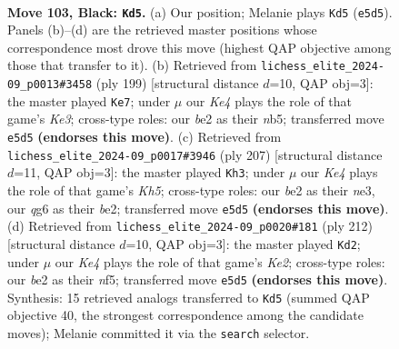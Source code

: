 \documentclass[11pt]{article}
\begin{document}
\clearpage

\begin{figure}[p]\centering
\begin{subfigure}{0.46\textwidth}\centering
\resizebox{\linewidth}{!}{%
\newchessgame
\chessboard[
  setfen={8/8/6Q1/4k1N1/1p6/4K3/4B3/8 b - - 0 103},
  showmover=false,
  pgfstyle=straightmove, color=movearrow, markmove={e5-d5}
]}
\caption{}
\end{subfigure}\hfill
\begin{subfigure}{0.46\textwidth}\centering
\resizebox{\linewidth}{!}{%
\newchessgame
\chessboard[
  setfen={8/8/2K1k3/1N6/5Q2/8/8/8 b - - 6 100},
  showmover=false,
  pgfstyle=straightmove, color=movearrow, markmove={e6-e7}
]}
\caption{}
\end{subfigure}
\\[4pt]
\begin{subfigure}{0.46\textwidth}\centering
\resizebox{\linewidth}{!}{%
\newchessgame
\chessboard[
  setfen={8/8/8/8/5K1k/4N3/4B3/8 b - - 40 104},
  showmover=false,
  pgfstyle=straightmove, color=movearrow, markmove={h4-h3}
]}
\caption{}
\end{subfigure}\hfill
\begin{subfigure}{0.46\textwidth}\centering
\resizebox{\linewidth}{!}{%
\newchessgame
\chessboard[
  setfen={8/8/8/5n2/5k2/8/4K3/6q1 w - - 0 107},
  showmover=false,
  pgfstyle=straightmove, color=movearrow, markmove={e2-d2}
]}
\caption{}
\end{subfigure}
\caption{\textbf{Move 103, Black: \texttt{Kd5}.} (a) Our position; Melanie plays \texttt{Kd5} (\texttt{e5d5}). Panels (b)--(d) are the retrieved master positions whose correspondence most drove this move (highest QAP objective among those that transfer to it). (b) Retrieved from \texttt{lichess\_elite\_2024-09\_p0013\#3458} (ply 199) [structural distance $d$=10, QAP obj=3]: the master played \texttt{Ke7}; under $\mu$ our \emph{Ke4} plays the role of that game's \emph{Ke3}; cross-type roles: our \emph{b}e2 as their \emph{n}b5; transferred move \texttt{e5d5} \textbf{(endorses this move)}. (c) Retrieved from \texttt{lichess\_elite\_2024-09\_p0017\#3946} (ply 207) [structural distance $d$=11, QAP obj=3]: the master played \texttt{Kh3}; under $\mu$ our \emph{Ke4} plays the role of that game's \emph{Kh5}; cross-type roles: our \emph{b}e2 as their \emph{n}e3, our \emph{q}g6 as their \emph{b}e2; transferred move \texttt{e5d5} \textbf{(endorses this move)}. (d) Retrieved from \texttt{lichess\_elite\_2024-09\_p0020\#181} (ply 212) [structural distance $d$=10, QAP obj=3]: the master played \texttt{Kd2}; under $\mu$ our \emph{Ke4} plays the role of that game's \emph{Ke2}; cross-type roles: our \emph{b}e2 as their \emph{n}f5; transferred move \texttt{e5d5} \textbf{(endorses this move)}. Synthesis: 15 retrieved analogs transferred to \texttt{Kd5} (summed QAP objective 40, the strongest correspondence among the candidate moves); Melanie committed it via the \texttt{search} selector.}
\label{fig:thought-m205}
\end{figure}
\end{document}
